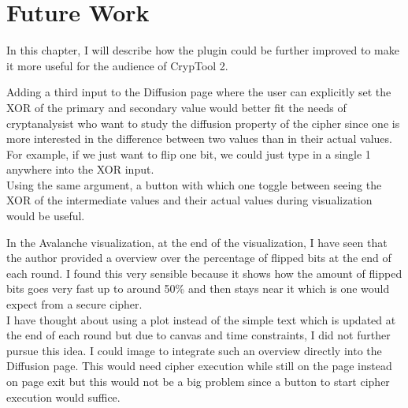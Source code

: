 \chapter{Future Work}
\label{chap:futureWork}

In this chapter, I will describe how the plugin could be further improved to make it more useful for the audience of CrypTool 2.

\begin{description}[style=nextline]
\item[Diffusion: XOR input and button to toggle between XOR and actual values] 

Adding a third input to the Diffusion page where the user can explicitly set the XOR of the primary and secondary value would better fit the needs of cryptanalysist who want to study the diffusion property of the cipher since one is more interested in the difference between two values than in their actual values. For example, if we just want to flip one bit, we could just type in a single 1 anywhere into the XOR input. \\
Using the same argument, a button with which one toggle between seeing the XOR of the intermediate values and their actual values during visualization would be useful.

\item[Diffusion: Better overview over flipped bits at the end of each round]

In the Avalanche visualization, at the end of the visualization, I have seen that the author provided a overview over the percentage of flipped bits at the end of each round. I found this very sensible because it shows how the amount of flipped bits goes very fast up to around 50\% and then stays near it which is one would expect from a secure cipher. \\
I have thought about using a plot instead of the simple text which is updated at the end of each round but due to canvas and time constraints, I did not further pursue this idea. I could image to integrate such an overview directly into the Diffusion page. This would need cipher execution while still on the page instead on page exit but this would not be a big problem since a button to start cipher execution would suffice.

\pagebreak

\item[Automatic navigation]


\end{description}
